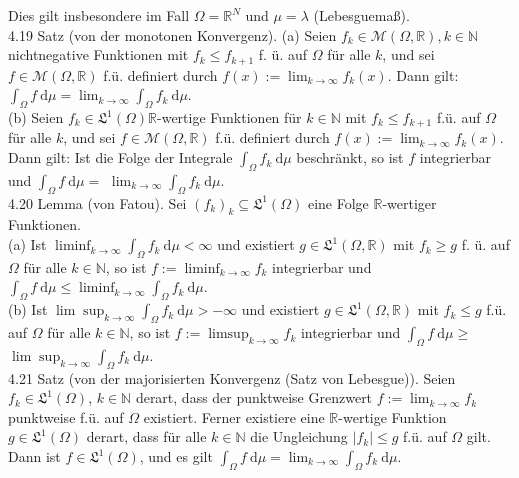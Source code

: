 \documentclass[10pt, letterpaper]{article}
\begin{document}
Dies gilt insbesondere im Fall $\Omega=\mathbb{R}^{N}$ und $\mu=\lambda$ (Lebesguemaß).\\
4.19 Satz (von der monotonen Konvergenz). (a) Seien $f_{k} \in \mathcal{M}(\Omega, \mathbb{R}), k \in \mathbb{N}$ nichtnegative Funktionen mit $f_{k} \leq f_{k+1}$ f. ü. auf $\Omega$ für alle $k$, und sei $f \in \mathcal{M}(\Omega, \mathbb{R})$ f.ü. definiert durch $f(x):=\lim _{k \rightarrow \infty} f_{k}(x)$. Dann gilt: $\int_{\Omega} f \mathrm{~d} \mu=\lim _{k \rightarrow \infty} \int_{\Omega} f_{k} \mathrm{~d} \mu$.\\
(b) Seien $f_{k} \in \mathfrak{L}^{1}(\Omega) \mathbb{R}$-wertige Funktionen für $k \in \mathbb{N}$ mit $f_{k} \leq f_{k+1}$ f.ü. auf $\Omega$ für alle $k$, und sei $f \in \mathcal{M}(\Omega, \mathbb{R})$ f.ü. definiert durch $f(x):=\lim _{k \rightarrow \infty} f_{k}(x)$. Dann gilt: Ist die Folge der Integrale $\int_{\Omega} f_{k} \mathrm{~d} \mu$ beschränkt, so ist $f$ integrierbar und $\int_{\Omega} f \mathrm{~d} \mu=$ $\lim _{k \rightarrow \infty} \int_{\Omega} f_{k} \mathrm{~d} \mu$.\\
4.20 Lemma (von Fatou). Sei $\left(f_{k}\right)_{k} \subseteq \mathfrak{L}^{1}(\Omega)$ eine Folge $\mathbb{R}$-wertiger Funktionen.\\
(a) Ist $\liminf _{k \rightarrow \infty} \int_{\Omega} f_{k} \mathrm{~d} \mu<\infty$ und existiert $g \in \mathfrak{L}^{1}(\Omega, \mathbb{R})$ mit $f_{k} \geq g$ f. ü. auf $\Omega$ für alle $k \in \mathbb{N}$, so ist $f:=\liminf _{k \rightarrow \infty} f_{k}$ integrierbar und $\int_{\Omega} f \mathrm{~d} \mu \leq \liminf _{k \rightarrow \infty} \int_{\Omega} f_{k} \mathrm{~d} \mu$.\\
(b) Ist $\lim \sup _{k \rightarrow \infty} \int_{\Omega} f_{k} \mathrm{~d} \mu>-\infty$ und existiert $g \in \mathfrak{L}^{1}(\Omega, \mathbb{R})$ mit $f_{k} \leq g$ f.ü. auf $\Omega$ für alle $k \in \mathbb{N}$, so ist $f:=\limsup _{k \rightarrow \infty} f_{k}$ integrierbar und $\int_{\Omega} f \mathrm{~d} \mu \geq$ $\lim \sup _{k \rightarrow \infty} \int_{\Omega} f_{k} \mathrm{~d} \mu$.\\
4.21 Satz (von der majorisierten Konvergenz (Satz von Lebesgue)). Seien $f_{k} \in \mathfrak{L}^{1}(\Omega)$, $k \in \mathbb{N}$ derart, dass der punktweise Grenzwert $f:=\lim _{k \rightarrow \infty} f_{k}$ punktweise f.ü. auf $\Omega$ existiert. Ferner existiere eine $\mathbb{R}$-wertige Funktion $g \in \mathfrak{L}^{1}(\Omega)$ derart, dass für alle $k \in \mathbb{N}$ die Ungleichung $\left|f_{k}\right| \leq g$ f.ü. auf $\Omega$ gilt. Dann ist $f \in \mathfrak{L}^{1}(\Omega)$, und es gilt $\int_{\Omega} f \mathrm{~d} \mu=\lim _{k \rightarrow \infty} \int_{\Omega} f_{k} \mathrm{~d} \mu$.
\end{document}
